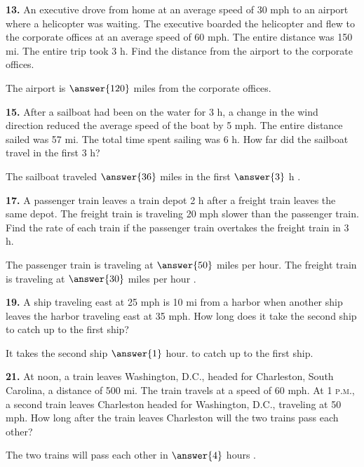 \documentclass{ximera}
\begin{document}
\begin{problem}
\textbf{13.} An executive drove from home at an average speed of 30 mph to an airport where a
  helicopter was waiting. The executive boarded the helicopter and flew to the corporate
  offices at an average speed of 60 mph. The entire distance was 150 mi. The entire trip
  took 3 h. Find the distance from the airport to the corporate offices.

The airport is $\answer{120}$ miles from the corporate offices.
\end{problem}

\begin{problem}
\textbf{15.} After a sailboat had been on the water for 3 h, a change in the wind direction
  reduced the average speed of the boat by 5 mph. The entire distance sailed was 57 mi.
  The total time spent sailing was 6 h. How far did the sailboat travel in the first 3 h?

The sailboat traveled $\answer{36}$ miles in the first $\answer{3}$ h .
\end{problem}

\begin{problem}
\textbf{17.} A passenger train leaves a train depot 2 h after a freight train leaves the same
  depot. The freight train is traveling 20 mph slower than the passenger train. Find the
  rate of each train if the passenger train overtakes the freight train in 3 h.

The passenger train is traveling at $ \answer{50}$ miles per hour.  The freight train is traveling at $\answer{30}$ miles per hour .
\end{problem}

\begin{problem}
\textbf{19.} A ship traveling east at 25 mph is 10 mi from a harbor when another ship leaves
  the harbor traveling east at 35 mph. How long does it take the second ship to catch up
  to the first ship?

It takes the second ship $\answer{1}$ hour. to catch up to the first ship.
\end{problem}

\begin{problem}
\textbf{21.} At noon, a train leaves Washington, D.C., headed for Charleston, South Carolina, a
  distance of 500 mi. The train travels at a speed of 60 mph. At 1 \textsc{p.m.}, a second
  train leaves Charleston headed for Washington, D.C., traveling at 50 mph. How long after
  the train leaves Charleston will the two trains pass each other?

The two trains will pass each other in $\answer{4}$ hours .
\end{problem}
\end{document}
